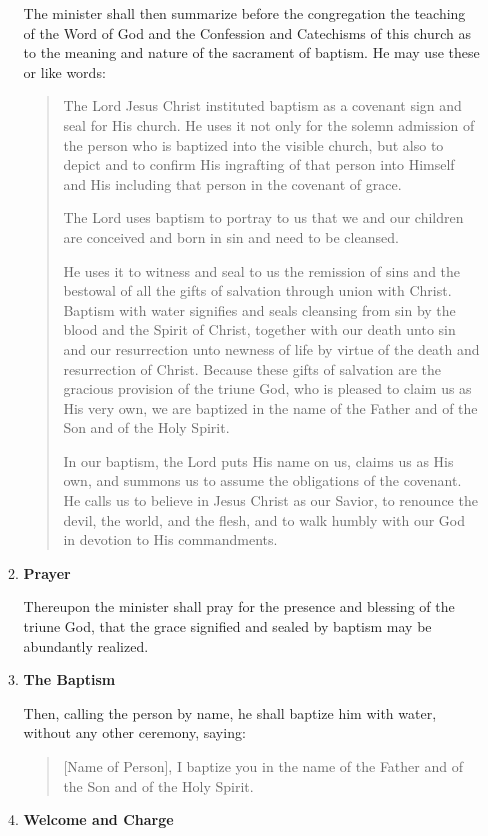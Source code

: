 \documentclass[
]{book}
\begin{document}
\begin{enumerate}
\begin{enumerate}
    The minister shall then summarize before the congregation the teaching of the Word of God and the Confession and Catechisms of this church as to the meaning and nature of the sacrament of baptism. He may use these or like words:

    \begin{quote}
    The Lord Jesus Christ instituted baptism as a covenant sign and seal for His church. He uses it not only for the solemn admission of the person who is baptized into the visible church, but also to depict and to confirm His ingrafting of that person into Himself and His including that person in the covenant of grace.

    The Lord uses baptism to portray to us that we and our children are conceived and born in sin and need to be cleansed.

    He uses it to witness and seal to us the remission of sins and the bestowal of all the gifts of salvation through union with Christ. Baptism with water signifies and seals cleansing from sin by the blood and the Spirit of Christ, together with our death unto sin and our resurrection unto newness of life by virtue of the death and resurrection of Christ. Because these gifts of salvation are the gracious provision of the triune God, who is pleased to claim us as His very own, we are baptized in the name of the Father and of the Son and of the Holy Spirit.

    In our baptism, the Lord puts His name on us, claims us as His own, and summons us to assume the obligations of the covenant. He calls us to believe in Jesus Christ as our Savior, to renounce the devil, the world, and the flesh, and to walk humbly with our God in devotion to His commandments.
    \end{quote}
  \item
    \textbf{Prayer}

    Thereupon the minister shall pray for the presence and blessing of the triune God, that the grace signified and sealed by baptism may be abundantly realized.
  \item
    \textbf{The Baptism}

    Then, calling the person by name, he shall baptize him with water, without any other ceremony, saying:

    \begin{quote}
    {[}Name of Person{]}, I baptize you in the name of the Father and of the Son and of the Holy Spirit.
    \end{quote}
  \item
    \textbf{Welcome and Charge}


\end{enumerate}
\end{enumerate}
\end{document}
